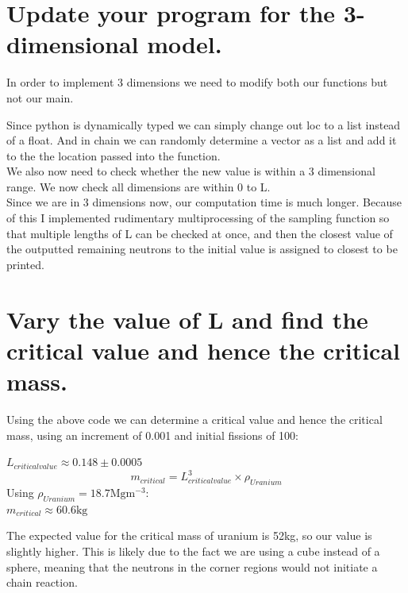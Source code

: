 \documentclass[a4paper,english]{article}
\begin{document}
    \section{Update your program for the 3-dimensional model.}
    In order to implement 3 dimensions we need to modify both our functions but not our main.
    
    Since python is dynamically typed we can simply change out loc to a list instead of a float. And in chain we can
    randomly determine a vector as a list and add it to the the location passed into the function.
    \\
    We also now need to check whether the new value is within a 3 dimensional range. We now check all dimensions are within 0 to L.
    \\
    Since we are in 3 dimensions now, our computation time is much longer. Because of this I implemented rudimentary multiprocessing of the sampling function so that multiple lengths of L can be checked at once, and then the closest value of the outputted remaining neutrons to the initial value is assigned to closest to be printed.
    \section{Vary the value of L and find the critical value and hence the critical mass.}
    Using the above code we can determine a critical value and hence the critical mass, using an increment of 0.001 and initial fissions of 100:
    \begin{center}
        $L_{criticalvalue} \approx 0.148 \pm 0.0005$\\
        \begin{equation*}
            m_{critical} = L_{criticalvalue}^3 \times \rho_{Uranium}
        \end{equation*}
    Using $\rho_{Uranium} = 18.7\textrm{Mgm$^{-3}$}$:\\
        $m_{critical} \approx 60.6\textrm{kg}$
    \end{center}
    The expected value for the critical mass of uranium is 52kg, so our value is slightly higher. This is likely due to the fact we are using a cube instead of a sphere, meaning that the neutrons in the corner regions would not initiate a chain reaction.
\end{document}
